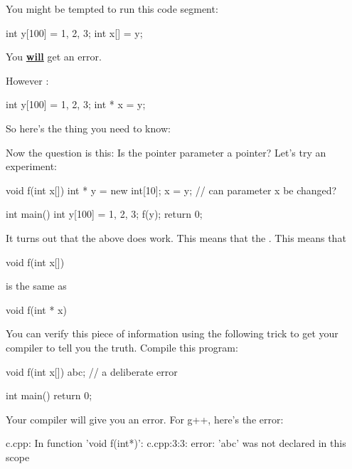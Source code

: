 You might be tempted to run this code segment:

\begin{consolethree}[escapeinside=||]
int y[100] = {1, 2, 3};
int x[] = y;
\end{consolethree}

You \textbf{\underline{will}} get an error.

However :

\begin{consolethree}[escapeinside=||]
int y[100] = {1, 2, 3};
int * x = y;
\end{consolethree}

So here's the thing you need to know:
\begin{center}
\end{center}
Now the question is this: Is the pointer parameter a
 pointer? Let's try an experiment:

\begin{consolethree}[escapeinside=||]
void f(int x[])
{
    int * y = new int[10];
    x = y; // can parameter x be changed?
}

int main()
{
    int y[100] = {1, 2, 3};
    f(y);
    return 0;
}
\end{consolethree}

It turns out that the above does work. This means that the . This means that

\begin{consolethree}[escapeinside=||]
void f(int x[])
{}
\end{consolethree}

is the same as

\begin{consolethree}[escapeinside=||]
void f(int * x)
{}
\end{consolethree}

You can verify this piece of information using the following trick to get your compiler to tell you the truth. Compile this program:

\begin{consolethree}[escapeinside=||]
void f(int x[])
{
    abc; // a deliberate error
}

int main()
{
    return 0;
}
\end{consolethree}

Your compiler will give you an error. For g++, here's
the error:

\begin{consolethree}[escapeinside=||]
c.cpp: In function 'void f(int*)':
c.cpp:3:3: error: 'abc' was not declared in this scope
\end{consolethree}

